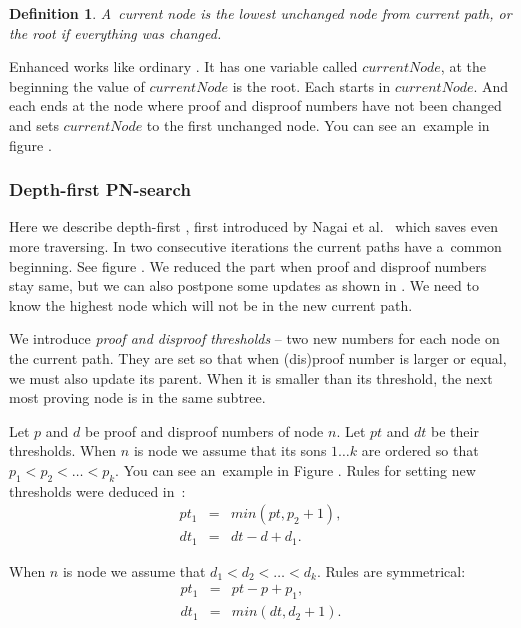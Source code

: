 \newtheorem*{currentNode}{Definition}	
\begin{currentNode}
A~{\sl current node} is the lowest unchanged node from current path, or
the root if everything was changed.
\end{currentNode}

Enhanced  works like ordinary . It has one variable
called $currentNode$, at the beginning the value of $currentNode$ is the root. Each
 starts in $currentNode$. And each 
ends at the node where proof and disproof numbers have not been changed and sets 
$currentNode$ to the first unchanged node. You can see an~example in figure .

\subsubsection{Depth-first PN-search} \label{dfpn}

Here we describe depth-first , first introduced by Nagai et al.~\cite{nagai}
which saves even more traversing. In two consecutive iterations the current
paths have a~common beginning. See figure . We reduced the part when
proof and disproof numbers stay same, but we can also postpone some updates as
shown in . We need to know the highest node which will not be in the
new current path. 

We introduce \emph{proof and disproof thresholds} -- two new numbers for each node on
the current path. They are set so that when (dis)proof number is larger or
equal, we must also update its parent. When it is smaller than its threshold,
the next most proving node is in the same subtree. 

Let $p$ and $d$ be proof and disproof numbers of node $n$. Let $pt$ and $dt$ be
their thresholds. When $n$ is  node we assume that its sons $1\ldots k$
are ordered so that $p_1 < p_2 < \ldots < p_k$. You can see an~example in
Figure . Rules for setting new thresholds were deduced in~\cite{epsilon}:
\begin{eqnarray*} 
	pt_1 &=& min(pt, p_2+1), \\
	dt_1 &=& dt - d + d_1.
\end{eqnarray*}

When $n$ is  node we assume that $d_1 < d_2 < \ldots < d_k$. Rules
are symmetrical:  
\begin{eqnarray*} 
	pt_1 &=& pt-p+p_1, \\
	dt_1 &=& min(dt,d_2+1).
\end{eqnarray*}

